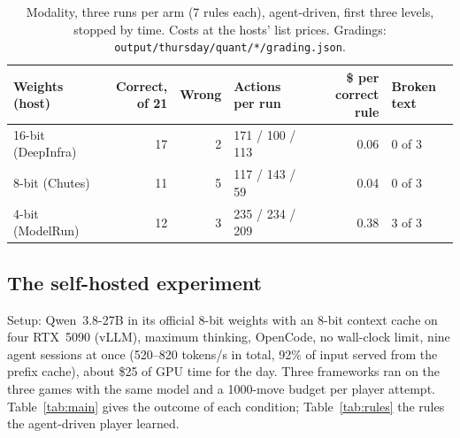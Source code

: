 \documentclass[11pt,a4paper]{article}
\newcommand{\qsmall}{Qwen~3.8-27B}
\begin{document}
\begin{table}[htbp]
  \centering\small
  \begin{tabular}{lrrlrl}
    \toprule
    Weights (host) & Correct, of 21 & Wrong & Actions per run &
    \$ per correct rule & Broken text \\
    \midrule
    16-bit (DeepInfra) & 17 & 2 & 171 / 100 / 113 & 0.06 & 0 of 3 \\
    8-bit (Chutes) & 11 & 5 & 117 / 143 / 59 & 0.04 & 0 of 3 \\
    4-bit (ModelRun) & 12 & 3 & 235 / 234 / 209 & 0.38 & 3 of 3 \\
    \bottomrule
  \end{tabular}
  \caption{Modality, three runs per arm (7 rules each), agent-driven, first
  three levels, stopped by time. Costs at the hosts' list prices.
  Gradings: \texttt{output/thursday/quant/*/grading.json}.}
  \label{tab:quant}
\end{table}

\subsection{The self-hosted experiment}

Setup: \qsmall{} in its official 8-bit weights with an 8-bit context cache on
four RTX~5090 (vLLM), maximum thinking, OpenCode, no wall-clock limit, nine
agent sessions at once (520--820 tokens/s in total, 92\% of input served from
the prefix cache), about \$25 of GPU time for the day. Three frameworks ran
on the three games with the same model and a 1000-move budget per player
attempt. Table~\ref{tab:main} gives the outcome of each condition;
Table~\ref{tab:rules} the rules the agent-driven player learned.
\end{document}
